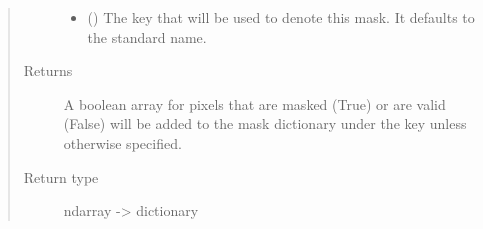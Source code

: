 \documentclass[letterpaper,10pt,english]{sphinxmanual}
\begin{document}
\begin{fulllineitems}
\begin{quote}
\begin{description}
\begin{itemize}
\item {} 
 (\sphinxstyleliteralemphasis{\sphinxupquote{ (}}\sphinxstyleliteralemphasis{\sphinxupquote{)}}) \textendash{} The key that will be used to denote this mask. It defaults to the
standard name.

\end{itemize}

\item[{Returns}] \leavevmode
{} \textendash{} A boolean array for pixels that are masked (True) or are valid (False)
will be added to the mask dictionary under the key
 unless otherwise specified.

\item[{Return type}] \leavevmode
ndarray -\textgreater{} dictionary

\end{description}\end{quote}

\end{fulllineitems}

\end{document}
